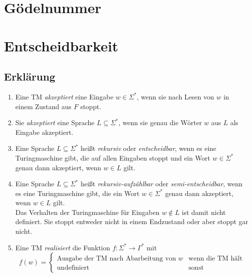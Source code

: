 



\section{Gödelnummer}

\section{Entscheidbarkeit}
\subsection{Erklärung}
\begin{frame}
	 \begin{enumerate}
  \item Eine TM \emph{akzeptiert} eine Eingabe $w \in \Sigma^*$, wenn sie nach Lesen von $w$ in einem Zustand aus $F$ stoppt.
  \item Sie \emph{akzeptiert} eine Sprache $L \subseteq \Sigma^*$, wenn sie genau die Wörter $w$ aus $L$ als Eingabe akzeptiert.
  \item Eine Sprache $L \subseteq \Sigma^*$ heißt \emph{rekursiv} oder \emph{entscheidbar}, wenn es eine Turingmaschine gibt, die auf allen Eingaben stoppt und
	ein Wort $w \in \Sigma^*$ genau dann akzeptiert, wenn $w \in L$ gilt.
\end{enumerate}
\end{frame}
\begin{frame}
 \begin{enumerate}
 \setcounter{enumi}{3}
  \item Eine Sprache $L \subseteq \Sigma^*$ heißt \emph{rekursiv-aufzählbar} oder \emph{semi-entscheidbar}, wenn es eine Turingmaschine gibt, die ein Wort $w \in \Sigma^*$ genau dann akzeptiert, wenn $w \in L$ gilt. \\ Das Verhalten der Turingmaschine für Eingaben $w \not\in L$ ist damit nicht definiert.
	Sie stoppt entweder nicht in einem Endzustand oder aber stoppt gar nicht.
	\item Eine TM \emph{realisiert} die Funktion $f: \Sigma^* \rightarrow \Gamma^*$ mit $$f(w) = \begin{cases} \text{Ausgabe der TM nach Abarbeitung von } w & \text{wenn die TM hält} \\ \text{undefiniert} & \text{sonst} \end{cases}$$
 \end{enumerate}
\end{frame}
